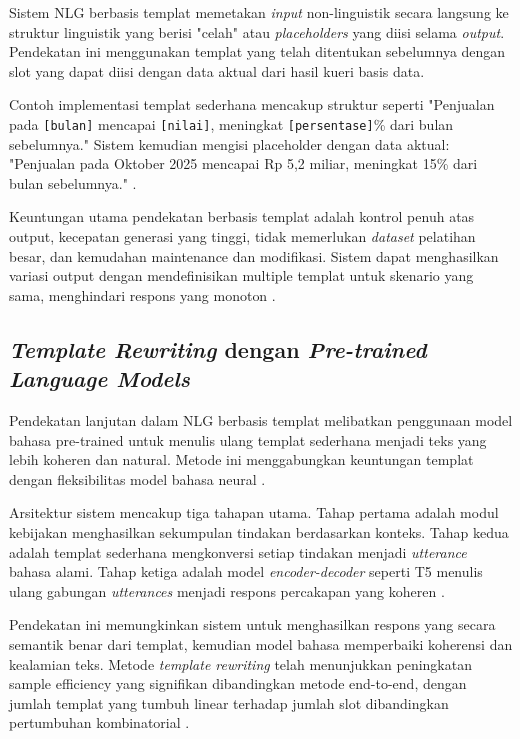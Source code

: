 Sistem NLG berbasis templat memetakan \textit{input} non-linguistik secara langsung ke struktur linguistik yang berisi "celah" atau \textit{placeholders} yang diisi selama \textit{output}. Pendekatan ini menggunakan templat yang telah ditentukan sebelumnya dengan slot yang dapat diisi dengan data aktual dari hasil kueri basis data.

Contoh implementasi templat sederhana mencakup struktur seperti "Penjualan pada \texttt{[bulan]} mencapai \texttt{[nilai]}, meningkat \texttt{[persentase]}\% dari bulan sebelumnya." Sistem kemudian mengisi placeholder dengan data aktual: "Penjualan pada Oktober 2025 mencapai Rp 5,2 miliar, meningkat 15\% dari bulan sebelumnya." \autocite{kale2020template}.

Keuntungan utama pendekatan berbasis templat adalah kontrol penuh atas output, kecepatan generasi yang tinggi, tidak memerlukan \textit{dataset} pelatihan besar, dan kemudahan maintenance dan modifikasi. Sistem dapat menghasilkan variasi output dengan mendefinisikan multiple templat untuk skenario yang sama, menghindari respons yang monoton \autocite{kapoor2023implementing}.

\subsection{\textit{Template Rewriting} dengan \textit{Pre-trained Language Models}}

Pendekatan lanjutan dalam NLG berbasis templat melibatkan penggunaan model bahasa pre-trained untuk menulis ulang templat sederhana menjadi teks yang lebih koheren dan natural. Metode ini menggabungkan keuntungan templat dengan fleksibilitas model bahasa neural \autocite{kale2020template,rebuffel2020fewshot}.

Arsitektur sistem mencakup tiga tahapan utama. Tahap pertama adalah modul kebijakan menghasilkan sekumpulan tindakan berdasarkan konteks. Tahap kedua adalah templat sederhana mengkonversi setiap tindakan menjadi \textit{utterance} bahasa alami. Tahap ketiga adalah model \textit{encoder-decoder} seperti T5 menulis ulang gabungan \textit{utterances} menjadi respons percakapan yang koheren \autocite{kale2020template}.

Pendekatan ini memungkinkan sistem untuk menghasilkan respons yang secara semantik benar dari templat, kemudian model bahasa memperbaiki koherensi dan kealamian teks. Metode \textit{template rewriting} telah menunjukkan peningkatan sample efficiency yang signifikan dibandingkan metode end-to-end, dengan jumlah templat yang tumbuh linear terhadap jumlah slot dibandingkan pertumbuhan kombinatorial \autocite{rebuffel2020fewshot}.


